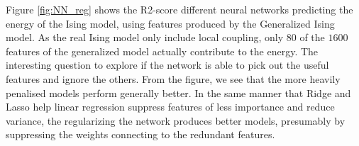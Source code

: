 Figure \autoref{fig:NN_reg} shows the R2-score different neural networks predicting the energy of the Ising model, using features produced by the Generalized Ising model. As the real Ising model only include local coupling, only $80$ of the $1600$ features of the generalized model actually contribute to the energy. The interesting question to explore if the network is able to pick out the useful features and ignore the others. From the figure, we see that the more heavily penalised models perform generally better. In the same manner that Ridge and Lasso help linear regression suppress features of less importance and reduce variance, the regularizing the network produces better models, presumably by suppressing the weights connecting to the redundant features. 

\begin{figure}[H]
\centering
{}
\qquad
{}

\end{figure}
